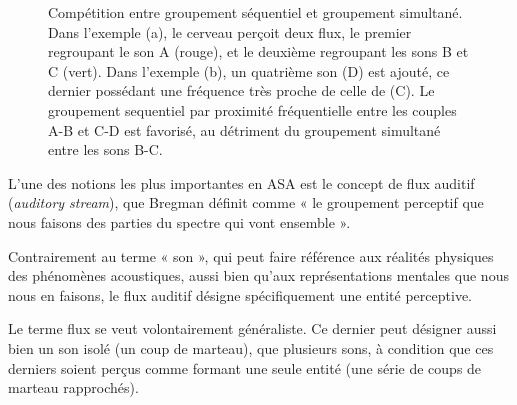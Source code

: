 \begin{figure}[t]
        \myfloatalign
        \caption[Compétition entre groupement séquentiel et groupement simultané.]{Compétition entre groupement séquentiel et groupement simultané. Dans l'exemple (a), le cerveau perçoit deux flux, le premier regroupant le son A (rouge), et le deuxième regroupant les sons B et C (vert). Dans l'exemple (b), un quatrième son (D) est ajouté, ce dernier possédant une fréquence très proche de celle de (C). Le groupement sequentiel par proximité fréquentielle entre les couples A-B et C-D est favorisé, au détriment du groupement simultané entre les sons B-C.}\label{fig:simvsseq}
\end{figure}

L'une des notions les plus importantes en ASA est le concept de flux auditif (\emph{auditory stream}), que Bregman définit comme « le groupement perceptif que nous faisons des parties du spectre qui vont ensemble ».

Contrairement au terme « son », qui peut faire référence aux réalités physiques des phénomènes acoustiques, aussi bien qu'aux représentations mentales que nous nous en faisons, le flux auditif désigne spécifiquement une entité perceptive.

Le terme flux se veut volontairement généraliste. Ce dernier peut désigner aussi bien un son isolé (un coup de marteau), que plusieurs sons, à condition que ces derniers soient perçus comme formant une seule entité (une série de coups de marteau rapprochés).

